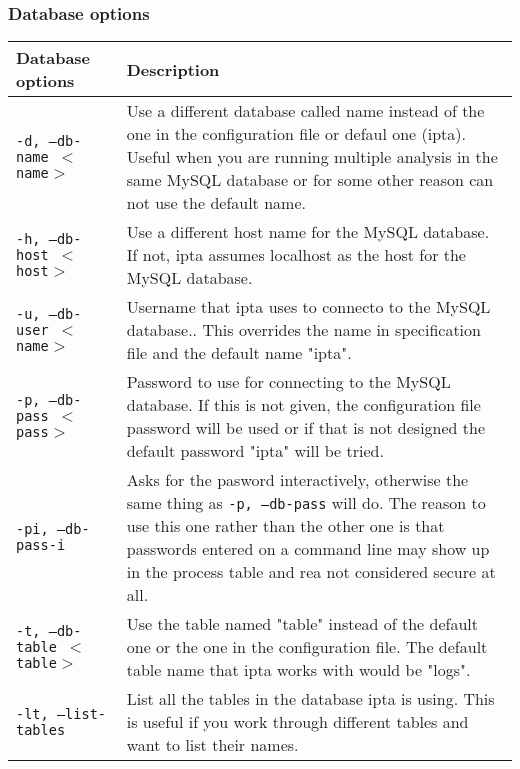 \documentclass[english,twoside,openright,a4paper,12pt]{article}
\begin{document}
\subsubsection{Database options}

\begin{longtable}{|p{}|p{}|}
\hline
\textbf{Database options} & \textbf{Description}\\ \hline

\texttt{-d, --db-name $<$name$>$} & Use a different database called
name instead of the one in the configuration file or defaul one
(ipta). Useful when you are running multiple analysis in the same
MySQL database or for some other reason can not use the default
name.\\\hline

\texttt{-h, --db-host $<$host$>$} & 

Use a different host name for the
MySQL database. If not, ipta assumes localhost as the host for the
MySQL database.\\\hline

\texttt{-u, --db-user $<$name$>$} & 

Username that ipta uses to connecto to the MySQL database.. This
overrides the name in specification file and the default name "ipta".
\\\hline

\texttt{-p, --db-pass $<$pass$>$} & 

Password to use for connecting to the MySQL database. If this is not
given, the configuration file password will be used or if that is not
designed the default password "ipta" will be tried.\\\hline

\texttt{-pi, --db-pass-i} & 

Asks for the pasword interactively, otherwise the same thing as
\texttt{-p, --db-pass} will do. The reason to use this one rather than
the other one is that passwords entered on a command line may show up
in the process table and rea not considered secure at all.\\\hline

\texttt{-t, --db-table $<$table$>$} & 

Use the table named "table" instead of the default one or the one in
the configuration file. The default table name that ipta works with
would be "logs".\\\hline

\texttt{-lt, --list-tables} & 

List all the tables in the database ipta is using. This is useful if
you work through different tables and want to list their
names.\\\hline


\end{longtable}
\end{document}
